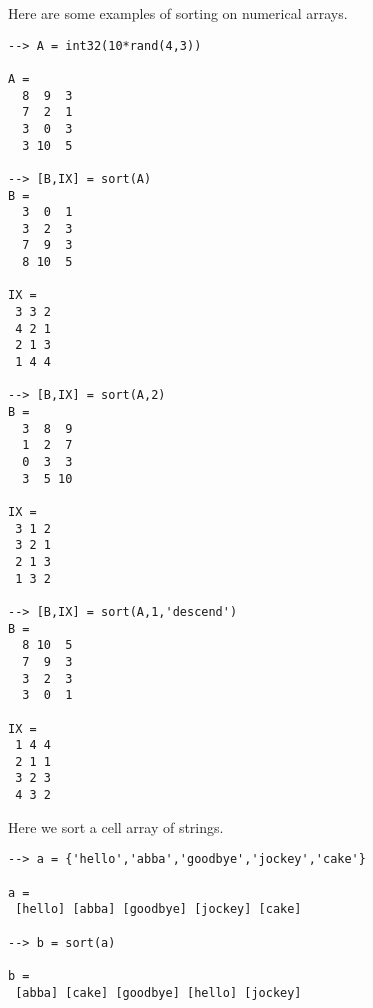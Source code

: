 Here are some examples of sorting on numerical arrays.
\begin{verbatim}
--> A = int32(10*rand(4,3))

A = 
  8  9  3 
  7  2  1 
  3  0  3 
  3 10  5 

--> [B,IX] = sort(A)
B = 
  3  0  1 
  3  2  3 
  7  9  3 
  8 10  5 

IX = 
 3 3 2 
 4 2 1 
 2 1 3 
 1 4 4 

--> [B,IX] = sort(A,2)
B = 
  3  8  9 
  1  2  7 
  0  3  3 
  3  5 10 

IX = 
 3 1 2 
 3 2 1 
 2 1 3 
 1 3 2 

--> [B,IX] = sort(A,1,'descend')
B = 
  8 10  5 
  7  9  3 
  3  2  3 
  3  0  1 

IX = 
 1 4 4 
 2 1 1 
 3 2 3 
 4 3 2 
\end{verbatim}
Here we sort a cell array of strings.
\begin{verbatim}
--> a = {'hello','abba','goodbye','jockey','cake'}

a = 
 [hello] [abba] [goodbye] [jockey] [cake] 

--> b = sort(a)

b = 
 [abba] [cake] [goodbye] [hello] [jockey] 
\end{verbatim}
